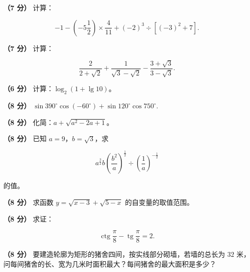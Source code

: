 \begin{question}
\textbf{（7 分）} 计算：

\nopagebreak[4]
\[
-1-\left(-5\frac{1}{2}\right)\times\frac{4}{11}+(-2)^3\div\left[(-3)^2+7\right].
\]

\end{question}
\begin{question}
\textbf{（7 分）} 计算：

\nopagebreak[4]
\[
\frac{2}{2+\sqrt{2}}+\frac{1}{\sqrt{3}-\sqrt{2}}-\frac{3+\sqrt{3}}{3-\sqrt{3}}.
\]

\end{question}
\begin{question}
\textbf{（6 分）} 计算：$\log_2(1+\lg10)$。

\end{question}
\begin{question}
\textbf{（8 分）} $\sin390^\circ\cos(-60^\circ)+\sin120^\circ\cos750^\circ.$

\end{question}
\begin{question}
\textbf{（8 分）} 化简：$a+\sqrt{a^2-2a+1}$。

\end{question}
\begin{question}
\textbf{（8 分）} 已知 $a=9$，$b=\sqrt{3}$，求

\nopagebreak[4]
\[
a^{\frac{3}{2}}b\left(\frac{b^2}{a}\right)^{\frac{1}{2}}\div\left(\frac{1}{a}\right)^{-\frac{1}{2}}
\]

的值。

\end{question}
\begin{question}
\textbf{（8 分）} 求函数 $y=\sqrt{x-3}+\sqrt{5-x}$ 的自变量的取值范围。

\end{question}
\begin{question}
\textbf{（8 分）} 求证：

\nopagebreak[4]
\[
\operatorname{ctg}\frac{\pi}{8}-\operatorname{tg}\frac{\pi}{8}=2.
\]

\Needspace{0.4\textheight}
\end{question}
\begin{question}
\textbf{（8 分）} 要建造轮廓为矩形的猪舍四间，按实线部分砌墙，若墙的总长为 $32$ 米，问每间猪舍的长、宽为几米时面积最大？每间猪舍的最大面积是多少？
\nopagebreak[4]
\begin{center}\end{center}
\nopagebreak[4]
\Needspace{0.4\textheight}
\end{question}
